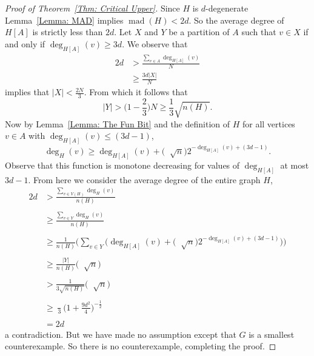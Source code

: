 \documentclass[10pt,a4paper]{amsart}
\DeclareMathOperator{\coe}{6\Big(1+\frac{9d^2}{4}\Big)^{\frac{1}{2}}d}
\DeclareMathOperator{\mad}{\text{mad}}
\begin{document}
\begin{proof}[Proof of Theorem~\ref{Thm: Critical Upper}]
Since $H$ is $d$-degenerate Lemma~\ref{Lemma: MAD} implies
$\mad(H) < 2d$. So the average degree of $H[A]$ is strictly less than $2d$.
Let $X$ and $Y$ be a partition of $A$ such that $v \in X$
if and only if $\deg_{H[A]}(v)\geq 3d$.
We observe that
\begin{align*}
    2d &> \frac{\sum_{v \in A} \deg_{H[A]}(v)}{N} \\
    & \geq \frac{3d|X|}{N}
\end{align*}
implies that $|X| < \frac{2N}{3}$. From which it follows that 
\[
|Y| > \Big(1-\frac{2}{3}\Big)N\geq  \frac{1}{3}\sqrt{n(H)}.
\]
Now
by Lemma~\ref{Lemma: The Fun Bit} and the definition of $H$ for all vertices $v \in A$ with $\deg_{H[A]}(v) \leq (3d-1)$,
\[
\deg_H(v) \geq  \deg_{H[A]}(v) + \Big( \coe \sqrt{n}\Big)2^{-\deg_{H[A]}(v)+(3d-1)}.
\]
Observe that this function is monotone decreasing for values of $\deg_{H[A]}$ at most $3d-1$.
From here we consider the average degree of the entire graph $H$,
\begin{align*}
    2d &> \frac{\sum_{v \in V(H)} \deg_{H}(v)}{n(H)} \\
    \\
    & \geq \frac{\sum_{v \in Y} \deg_{H}(v)}{n(H)} \\
    \\
    & \geq \frac{1}{n(H)} \Bigg(\sum_{v\in Y} \Big(\deg_{H[A]}(v) + \Big(\coe\sqrt{n}\Big)2^{-\deg_{H[A]}(v)+(3d-1)}\Big)\Bigg) \\
    \\
    &\geq \frac{|Y|}{n(H)}\Bigg(\coe\sqrt{n} \Bigg)  \\
    \\ 
    &>\frac{1}{3\sqrt{n(H)}}\Bigg(\coe\sqrt{n} \Bigg) \\
    \\
    & \geq \frac{\coe }{3} \Bigg(1+\frac{9d^2}{4}\Bigg)^{-\frac{1}{2}}\\
    \\
    & = 2d
\end{align*}
a contradiction. But we have made no assumption except that $G$ is a smallest counterexample.
So there is no counterexample, completing the proof.
\end{proof}
\end{document}
